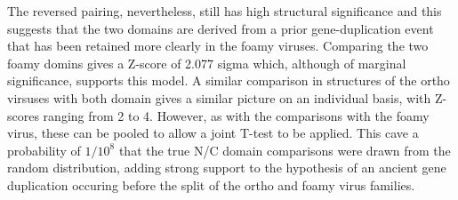 The reversed pairing, nevertheless, still has high structural significance and this
suggests that the two domains are derived from a prior gene-duplication event that has
been retained more clearly in the foamy viruses.   Comparing the two foamy domins gives
a Z-score of 2.077 sigma which, although of marginal significance, supports this model.
A similar comparison in structures of the ortho virsuses with both domain gives a
similar picture on an individual basis, with Z-scores ranging from 2 to 4.  However,
as with the comparisons with the foamy virus, these can be pooled to allow a joint
T-test to be applied.   This cave a probability of $1/10^8$ that the true N/C domain
comparisons were drawn from the random distribution, adding strong support to the
hypothesis of an ancient gene duplication occuring before the split of the ortho 
and foamy virus families.

